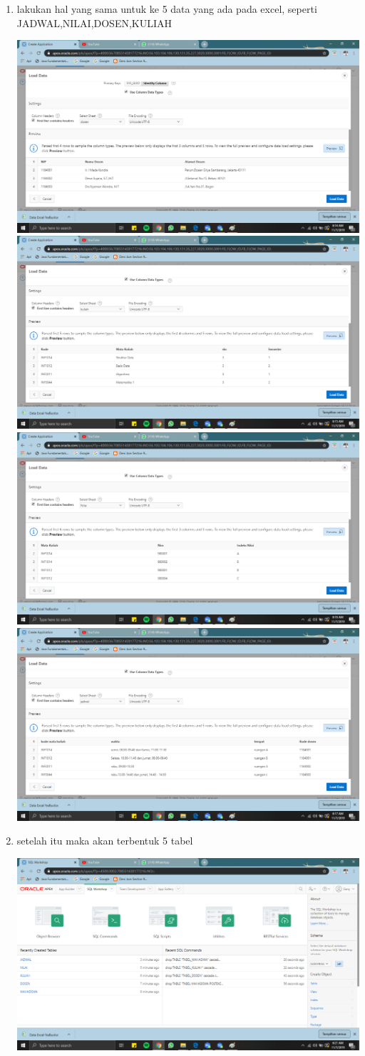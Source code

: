 \documentclass{article}
\begin{document}
\begin{enumerate}
\begin{center}
    \end{center}
    \item lakukan hal yang sama untuk ke 5 data yang ada pada excel, seperti JADWAL,NILAI,DOSEN,KULIAH
    \begin{center}
    \includegraphics[width=.6\textwidth]{gambar/9.png}
    \includegraphics[width=.6\textwidth]{gambar/10.png}
    \includegraphics[width=.6\textwidth]{gambar/11.png}
    \includegraphics[width=.6\textwidth]{gambar/12.png}
    \end{center}
    \item setelah itu maka akan terbentuk 5 tabel
    \begin{center}
    \includegraphics[width=.6\textwidth]{gambar/13.png}

\end{center}
\end{enumerate}
\end{document}
